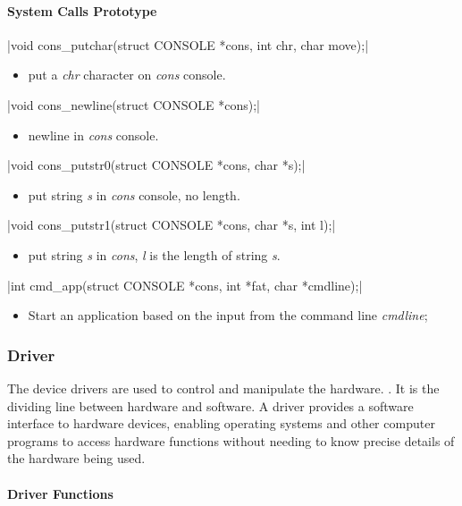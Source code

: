\documentclass{swfcthesis}
\begin{document}
\paragraph{System Calls Prototype}

\csingle|void cons_putchar(struct CONSOLE *cons, int chr, char move);|
\begin{itemize}
\item put a \emph{chr} character on \emph{cons} console.
\end{itemize}

\csingle|void cons_newline(struct CONSOLE *cons);|
\begin{itemize}
\item newline in \emph{cons} console.
\end{itemize}

\csingle|void cons_putstr0(struct CONSOLE *cons, char *s);|
\begin{itemize}
\item put string \emph{s} in \emph{cons} console, no length.
\end{itemize}

\csingle|void cons_putstr1(struct CONSOLE *cons, char *s, int l);|
\begin{itemize}
\item put string \emph{s} in \emph{cons}, \emph{l} is the length of string
  \emph{s}.
\end{itemize}

\csingle|int cmd_app(struct CONSOLE *cons, int *fat, char *cmdline);|
\begin{itemize}
\item Start an application based on the input from the command line \emph{cmdline};
\end{itemize}

\subsubsection{Driver}
\label{sec:driver}

The device drivers are used to control and manipulate the
hardware. . It is the
dividing line between hardware and software. A driver provides a software interface to
hardware devices, enabling operating systems and other computer programs to access
hardware functions without needing to know precise details of the hardware being used.

\paragraph{Driver Functions}
\end{document}
